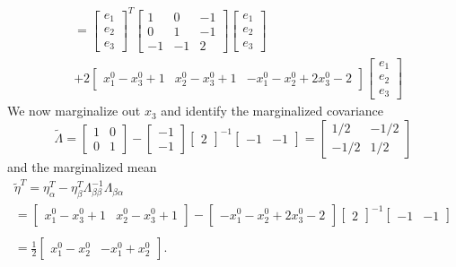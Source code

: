 $$\begin{aligned}
      & = \begin{bmatrix}
      e_1 \\ e_2 \\ e_3
    \end{bmatrix}^T \begin{bmatrix}
      1 & 0 & -1 \\ 0 & 1 & -1 \\ -1 & -1 & 2
    \end{bmatrix} \begin{bmatrix}
      e_1 \\ e_2 \\ e_3
    \end{bmatrix}                                                                                                                                                                                      \\
      & + 2 \begin{bmatrix}
      x_1^0 - x_3^0 +1 & x_2^0 - x_3^0 + 1 & -x_1^0 - x_2^0 + 2 x_3^0 -2
    \end{bmatrix} \begin{bmatrix}
      e_1 \\ e_2 \\ e_3
    \end{bmatrix}
  \end{aligned}
$$
We now marginalize out $x_3$ and identify the marginalized covariance
$$
  \tilde \Lambda = \begin{bmatrix}
    1 & 0 \\ 0 & 1
  \end{bmatrix} - \begin{bmatrix}
    -1 \\ -1
  \end{bmatrix} \begin{bmatrix}
    2
  \end{bmatrix}^{-1} \begin{bmatrix}
    -1 & -1
  \end{bmatrix} = \begin{bmatrix}
    1/2 & -1/2 \\ -1/2 & 1/2
  \end{bmatrix}
$$
and the marginalized mean
$$
  \begin{aligned}
    \tilde \eta^T = \eta_{\alpha}^T - \eta_\beta^T \Lambda_{\beta \beta}^{-1} \Lambda_{\beta \alpha} \\
    = \begin{bmatrix}
      x_1^0 - x_3^0 +1 & x_2^0 - x_3^0 + 1
    \end{bmatrix} - \begin{bmatrix} -x_1^0 - x_2^0 + 2 x_3^0 -2\end{bmatrix} \begin{bmatrix}
      2
    \end{bmatrix}^{-1} \begin{bmatrix}
      -1 & -1
    \end{bmatrix} \\
    \\
    = \frac{1}{2}\begin{bmatrix}
      x_1^0 - x_2^0 & -x_1^0 + x_2^0
    \end{bmatrix}.
  \end{aligned}
$$

